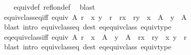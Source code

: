 \begin{isabellebody}
%
\isadelimproof
\ \ %
\endisadelimproof
%
\isatagproof
{}\isamarkupfalse%
\ equiv{\isacharunderscore}{\kern0pt}def\ refl{\isacharunderscore}{\kern0pt}on{\isacharunderscore}{\kern0pt}def\ \isamarkupfalse%
\ blast%
\endisatagproof
{\isafoldproof}%
%
\isadelimproof
\isanewline
%
\endisadelimproof
\isanewline
{}\isamarkupfalse%
\ equiv{\isacharunderscore}{\kern0pt}class{\isacharunderscore}{\kern0pt}eq{\isacharunderscore}{\kern0pt}iff{\isacharcolon}{\kern0pt}\ {\isachardoublequoteopen}equiv\ A\ r\ {\isasymLongrightarrow}\ {\isacharparenleft}{\kern0pt}x{\isacharcomma}{\kern0pt}\ y{\isacharparenright}{\kern0pt}\ {\isasymin}\ r\ {\isasymlongleftrightarrow}\ r{\isacharbackquote}{\kern0pt}{\isacharbackquote}{\kern0pt}{\isacharbraceleft}{\kern0pt}x{\isacharbraceright}{\kern0pt}\ {\isacharequal}{\kern0pt}\ r{\isacharbackquote}{\kern0pt}{\isacharbackquote}{\kern0pt}{\isacharbraceleft}{\kern0pt}y{\isacharbraceright}{\kern0pt}\ {\isasymand}\ x\ {\isasymin}\ A\ {\isasymand}\ y\ {\isasymin}\ A{\isachardoublequoteclose}\isanewline
%
\isadelimproof
\ \ %
\endisadelimproof
%
\isatagproof
{}\isamarkupfalse%
\ {\isacharparenleft}{\kern0pt}blast\ intro{\isacharbang}{\kern0pt}{\isacharcolon}{\kern0pt}\ equiv{\isacharunderscore}{\kern0pt}class{\isacharunderscore}{\kern0pt}eq\ dest{\isacharcolon}{\kern0pt}\ eq{\isacharunderscore}{\kern0pt}equiv{\isacharunderscore}{\kern0pt}class\ equiv{\isacharunderscore}{\kern0pt}type{\isacharparenright}{\kern0pt}%
\endisatagproof
{\isafoldproof}%
%
\isadelimproof
\isanewline
%
\endisadelimproof
\isanewline
{}\isamarkupfalse%
\ eq{\isacharunderscore}{\kern0pt}equiv{\isacharunderscore}{\kern0pt}class{\isacharunderscore}{\kern0pt}iff{\isacharcolon}{\kern0pt}\ {\isachardoublequoteopen}equiv\ A\ r\ {\isasymLongrightarrow}\ x\ {\isasymin}\ A\ {\isasymLongrightarrow}\ y\ {\isasymin}\ A\ {\isasymLongrightarrow}\ r{\isacharbackquote}{\kern0pt}{\isacharbackquote}{\kern0pt}{\isacharbraceleft}{\kern0pt}x{\isacharbraceright}{\kern0pt}\ {\isacharequal}{\kern0pt}\ r{\isacharbackquote}{\kern0pt}{\isacharbackquote}{\kern0pt}{\isacharbraceleft}{\kern0pt}y{\isacharbraceright}{\kern0pt}\ {\isasymlongleftrightarrow}\ {\isacharparenleft}{\kern0pt}x{\isacharcomma}{\kern0pt}\ y{\isacharparenright}{\kern0pt}\ {\isasymin}\ r{\isachardoublequoteclose}\isanewline
%
\isadelimproof
\ \ %
\endisadelimproof
%
\isatagproof
{}\isamarkupfalse%
\ {\isacharparenleft}{\kern0pt}blast\ intro{\isacharbang}{\kern0pt}{\isacharcolon}{\kern0pt}\ equiv{\isacharunderscore}{\kern0pt}class{\isacharunderscore}{\kern0pt}eq\ dest{\isacharcolon}{\kern0pt}\ eq{\isacharunderscore}{\kern0pt}equiv{\isacharunderscore}{\kern0pt}class\ equiv{\isacharunderscore}{\kern0pt}type{\isacharparenright}{\kern0pt}%

\end{isabellebody}
